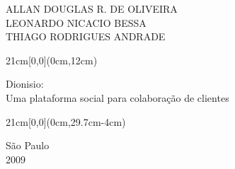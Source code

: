 \begin{center}
  {\large ALLAN DOUGLAS R. DE OLIVEIRA \\
    LEONARDO NICACIO BESSA \\
    THIAGO RODRIGUES ANDRADE}
\end{center}

\begin{textblock*}{21cm}[0,0](0cm,12cm)
  \begin{center}
    {\LARGE Dionisio:\\ Uma plataforma social para colaboração de clientes }
  \end{center}
\end{textblock*}


\begin{textblock*}{21cm}[0,0](0cm,29.7cm-4cm)
  \begin{center}
    {\large São Paulo \\ 2009 }
  \end{center}
\end{textblock*}


